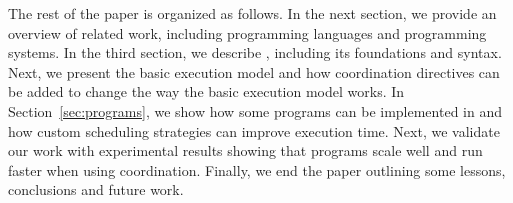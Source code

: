 The rest of the paper is organized as follows. In the next section, we provide an overview of related work, including
programming languages and programming systems. In the third section, we describe \lang, including its foundations and syntax.
Next, we present the basic execution model and how coordination directives can be added to change the way the basic execution model works.
In Section~\ref{sec:programs}, we show how some programs can be implemented in \lang and how custom scheduling strategies
can improve execution time.
Next, we validate our work with experimental results showing that \lang programs scale well and run faster when using coordination.
Finally, we end the paper outlining some lessons, conclusions and future work.
